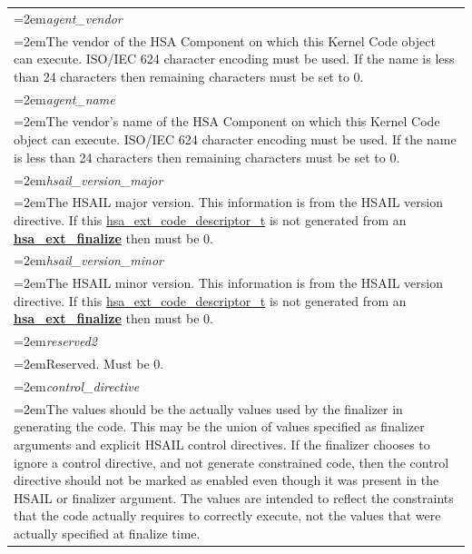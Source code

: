 \documentclass[final]{book}
\newcommand{\reffun}[1]{\textbf{#1}}
\newcommand{\reffld}[1]{\textit{#1}}
\begin{document}
\begin{longtable}{@{}>{\hangindent=2em}p{\textwidth}}
\reffld{agent_\-vendor}\\\hspace{2em}The vendor of the HSA Component on which this Kernel Code object can execute. ISO/IEC 624 character encoding must be used. If the name is less than 24 characters then remaining characters must be set to 0.\\[2mm]
\reffld{agent_\-name}\\\hspace{2em}The vendor's name of the HSA Component on which this Kernel Code object can execute. ISO/IEC 624 character encoding must be used. If the name is less than 24 characters then remaining characters must be set to 0.\\[2mm]
\reffld{hsail_\-version_\-major}\\\hspace{2em}The HSAIL major version. This information is from the HSAIL version directive. If this \hyperlink{group__finalizer_1ga0e01eabc57d7105ea37e1abbb50fa337}{hsa_\-ext_\-code_\-descriptor_\-t} is not generated from an \hyperlink{group__finalizer_1gad42cf738ed29770a7cec53fc13009a93}{\reffun{hsa_\-ext_\-finalize}} then must be 0.\\[2mm]
\reffld{hsail_\-version_\-minor}\\\hspace{2em}The HSAIL minor version. This information is from the HSAIL version directive. If this \hyperlink{group__finalizer_1ga0e01eabc57d7105ea37e1abbb50fa337}{hsa_\-ext_\-code_\-descriptor_\-t} is not generated from an \hyperlink{group__finalizer_1gad42cf738ed29770a7cec53fc13009a93}{\reffun{hsa_\-ext_\-finalize}} then must be 0.\\[2mm]
\reffld{reserved2}\\\hspace{2em}Reserved. Must be 0.\\[2mm]
\reffld{control_\-directive}\\\hspace{2em}The values should be the actually values used by the finalizer in generating the code. This may be the union of values specified as finalizer arguments and explicit HSAIL control directives. If the finalizer chooses to ignore a control directive, and not generate constrained code, then the control directive should not be marked as enabled even though it was present in the HSAIL or finalizer argument. The values are intended to reflect the constraints that the code actually requires to correctly execute, not the values that were actually specified at finalize time.
\end{longtable}
\end{document}
